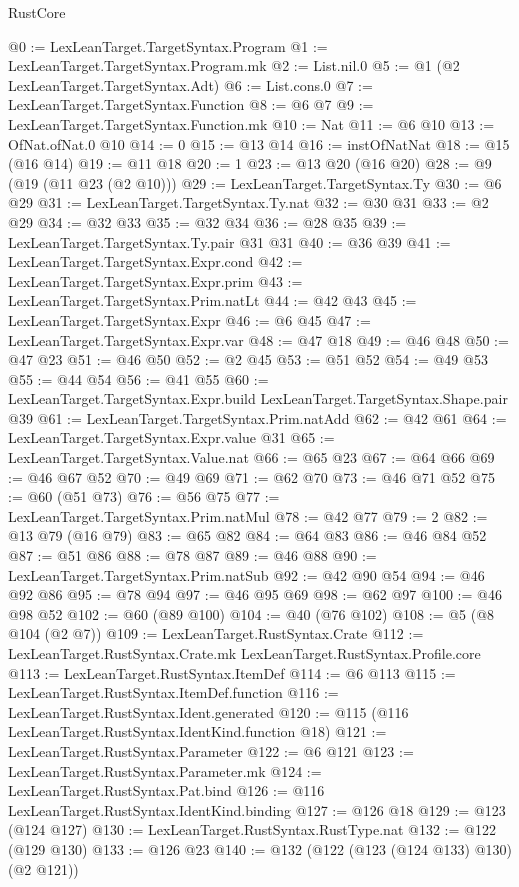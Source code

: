 \begin{lexlean}{RustCore}
\begin{coremodule}
@0 := LexLeanTarget.TargetSyntax.Program
@1 := LexLeanTarget.TargetSyntax.Program.mk
@2 := List.nil.{0}
@5 := @1 (@2 LexLeanTarget.TargetSyntax.Adt)
@6 := List.cons.{0}
@7 := LexLeanTarget.TargetSyntax.Function
@8 := @6 @7
@9 := LexLeanTarget.TargetSyntax.Function.mk
@10 := Nat
@11 := @6 @10
@13 := OfNat.ofNat.{0} @10
@14 := 0
@15 := @13 @14
@16 := instOfNatNat
@18 := @15 (@16 @14)
@19 := @11 @18
@20 := 1
@23 := @13 @20 (@16 @20)
@28 := @9 (@19 (@11 @23 (@2 @10)))
@29 := LexLeanTarget.TargetSyntax.Ty
@30 := @6 @29
@31 := LexLeanTarget.TargetSyntax.Ty.nat
@32 := @30 @31
@33 := @2 @29
@34 := @32 @33
@35 := @32 @34
@36 := @28 @35
@39 := LexLeanTarget.TargetSyntax.Ty.pair @31 @31
@40 := @36 @39
@41 := LexLeanTarget.TargetSyntax.Expr.cond
@42 := LexLeanTarget.TargetSyntax.Expr.prim
@43 := LexLeanTarget.TargetSyntax.Prim.natLt
@44 := @42 @43
@45 := LexLeanTarget.TargetSyntax.Expr
@46 := @6 @45
@47 := LexLeanTarget.TargetSyntax.Expr.var
@48 := @47 @18
@49 := @46 @48
@50 := @47 @23
@51 := @46 @50
@52 := @2 @45
@53 := @51 @52
@54 := @49 @53
@55 := @44 @54
@56 := @41 @55
@60 := LexLeanTarget.TargetSyntax.Expr.build LexLeanTarget.TargetSyntax.Shape.pair @39
@61 := LexLeanTarget.TargetSyntax.Prim.natAdd
@62 := @42 @61
@64 := LexLeanTarget.TargetSyntax.Expr.value @31
@65 := LexLeanTarget.TargetSyntax.Value.nat
@66 := @65 @23
@67 := @64 @66
@69 := @46 @67 @52
@70 := @49 @69
@71 := @62 @70
@73 := @46 @71 @52
@75 := @60 (@51 @73)
@76 := @56 @75
@77 := LexLeanTarget.TargetSyntax.Prim.natMul
@78 := @42 @77
@79 := 2
@82 := @13 @79 (@16 @79)
@83 := @65 @82
@84 := @64 @83
@86 := @46 @84 @52
@87 := @51 @86
@88 := @78 @87
@89 := @46 @88
@90 := LexLeanTarget.TargetSyntax.Prim.natSub
@92 := @42 @90 @54
@94 := @46 @92 @86
@95 := @78 @94
@97 := @46 @95 @69
@98 := @62 @97
@100 := @46 @98 @52
@102 := @60 (@89 @100)
@104 := @40 (@76 @102)
@108 := @5 (@8 @104 (@2 @7))
@109 := LexLeanTarget.RustSyntax.Crate
@112 := LexLeanTarget.RustSyntax.Crate.mk LexLeanTarget.RustSyntax.Profile.core
@113 := LexLeanTarget.RustSyntax.ItemDef
@114 := @6 @113
@115 := LexLeanTarget.RustSyntax.ItemDef.function
@116 := LexLeanTarget.RustSyntax.Ident.generated
@120 := @115 (@116 LexLeanTarget.RustSyntax.IdentKind.function @18)
@121 := LexLeanTarget.RustSyntax.Parameter
@122 := @6 @121
@123 := LexLeanTarget.RustSyntax.Parameter.mk
@124 := LexLeanTarget.RustSyntax.Pat.bind
@126 := @116 LexLeanTarget.RustSyntax.IdentKind.binding
@127 := @126 @18
@129 := @123 (@124 @127)
@130 := LexLeanTarget.RustSyntax.RustType.nat
@132 := @122 (@129 @130)
@133 := @126 @23
@140 := @132 (@122 (@123 (@124 @133) @130) (@2 @121))

\end{coremodule}
\end{lexlean}
